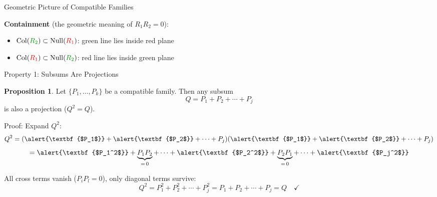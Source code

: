 \documentclass[10pt]{beamer}
\theoremstyle{definition}
\newtheorem{prop}{Proposition}[section]
\newcommand{\x}[1]{\alert{\textbf{#1}}}
\begin{document}
\begin{frame}[fragile]{Geometric Picture of Compatible Families}
\vspace{-0.3em}

\x{Containment} (the geometric meaning of $R_1 R_2 = 0$):
\begin{itemize}
\item $\operatorname{Col}({\color{green!60!black}R_2}) \subset \operatorname{Null}({\color{red}R_1})$: green line lies inside red plane
\item $\operatorname{Col}({\color{red}R_1}) \subset \operatorname{Null}({\color{green!60!black}R_2})$: red line lies inside green plane
\end{itemize}

\end{frame}


\begin{frame}{Property 1: Subsums Are Projections}

\begin{prop}
Let $\{P_1, \ldots, P_k\}$ be a compatible family. Then any subsum
$$Q = P_1 + P_2 + \cdots + P_j$$
is also a projection ($Q^2 = Q$).
\end{prop}

\vspace{0.3em}

Proof: Expand $Q^2$:
$$Q^2 = (\x{$P_1$} + \x{$P_2$} + \cdots + P_j)(\x{$P_1$} + \x{$P_2$} + \cdots + P_j)$$
$$= \x{$P_1^2$} + \underbrace{P_1 P_2}_{=\,0} + \cdots + \x{$P_2^2$} + \underbrace{P_2 P_1}_{=\,0} + \cdots + \x{$P_j^2$}$$

All cross terms vanish ($P_i P_l = 0$), only diagonal terms survive:
$$Q^2 = P_1^2 + P_2^2 + \cdots + P_j^2 = P_1 + P_2 + \cdots + P_j = Q \quad \checkmark$$

\end{frame}
\end{document}
